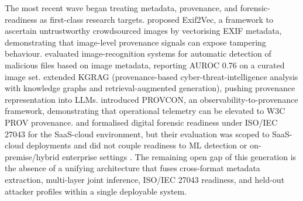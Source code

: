 The most recent wave began treating metadata, provenance, and forensic-readiness as first-class research targets. \citet{umair2024exif2vec} proposed Exif2Vec, a framework to ascertain untrustworthy crowdsourced images by vectorising EXIF metadata, demonstrating that image-level provenance signals can expose tampering behaviour. \citet{yasenenko2025evaluating} evaluated image-recognition systems for automatic detection of malicious files based on image metadata, reporting AUROC 0.76 on a curated image set. \citet{aki2025provenance} extended KGRAG (provenance-based cyber-threat-intelligence analysis with knowledge graphs and retrieval-augmented generation), pushing provenance representation into LLMs. \citet{yusof2025provcon} introduced PROVCON, an observability-to-provenance framework, demonstrating that operational telemetry can be elevated to W3C PROV provenance. \citet{shoderu2025dfrsaas} and \citet{shoderu2026dfrconference} formalised digital forensic readiness under ISO/IEC 27043 for the SaaS-cloud environment, but their evaluation was scoped to SaaS-cloud deployments and did not couple readiness to ML detection or on-premise/hybrid enterprise settings \citep{shoderu2025dfrsaas, shoderu2026dfrconference}. The remaining open gap of this generation is the absence of a unifying architecture that fuses cross-format metadata extraction, multi-layer joint inference, ISO/IEC 27043 readiness, and held-out attacker profiles within a single deployable system.

